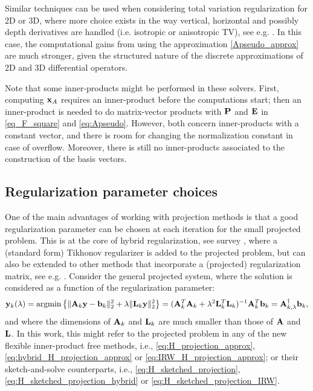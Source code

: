 \documentclass[11pt]{article}
\numberwithin{equation}{section}
\newcommand{\bfA}{{\bf A}}
\newcommand{\bfE}{{\bf E}}
\newcommand{\bfL}{{\bf L}}
\newcommand{\bfP}{{\bf P}}
\newcommand{\bfb}{{\bf b}}
\newcommand{\bfx}{{\bf x}}
\newcommand{\bfy}{{\bf y}}
\DeclareMathOperator*{\argmin}{argmin}
\begin{document}
Similar techniques can be used when considering total variation regularization for 2D or 3D, where more choice exists in the way vertical, horizontal and possibly depth derivatives are handled (i.e. isotropic or anisotropic TV), see e.g. \cite{Gazzola2021Edge, Gholami2024TV}. In this case, the computational gains from using the approximation \eqref{Apseudo_approx} are much stronger, given the structured nature of the discrete approximations of 2D and 3D differential operators.

Note that some inner-products might be performed in these solvers. First, computing $\bfx_A$ requires an inner-product before the computations start; then an inner-product is needed to do matrix-vector products with $\bfP$ and $\bfE$ in \eqref{eq_F_square} and  \eqref{eq:Apseudo}. However, both concern inner-products with a constant vector, and there is room for changing the normalization constant in case of overflow. Moreover, there is still no inner-products associated to the construction of the basis vectors.


\subsection{Regularization parameter choices}
One of the main advantages of working with projection methods is that a good regularization parameter can be chosen at each iteration for the small projected problem. This is at the core of hybrid regularization, see survey \cite{Chung2024survey}, where a (standard form) Tikhonov regularizer is added to the projected problem, but can also be extended to other methods that incorporate a (projected) regularization matrix, see e.g. \cite{buccini2022comparison, Gazzola2021IRW}.
Consider the general projected system, where the solution is considered as a function of the regularization parameter:
\begin{equation}\label{Asolve}
\bfy_k(\lambda) = \argmin \left\{ \|\bfA_k\bfy-\bfb_k\|_2^2+\lambda\|\bfL_k\bfy\|_2^2 \right\} = (\bfA_k^{T}\bfA_k+\lambda^2 \bfL_k^{T}\bfL_k)^{-1}\bfA_k^{T}\bfb_k =\bfA_{k,\lambda}^{\dagger} \bfb_k,
\end{equation} 
and where the dimensions of $\bfA_k$ and $\bfL_k$  are much smaller than those of $\bfA$ and $\bfL$. In this work, this might refer to the projected problem in any of the new flexible inner-product free methods, i.e., \eqref{eq:H_projection_approx},\eqref{eq:hybrid_H_projection_approx} or  \eqref{eq:IRW_H_projection_approx}; or their sketch-and-solve counterparts, i.e.,  \eqref{eq:H_sketched_projection},\eqref{eq:H_sketched_projection_hybrid} or  \eqref{eq:H_sketched_projection_IRW}.
\end{document}
